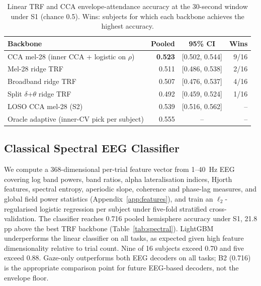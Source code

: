 \documentclass{article}
\begin{document}
\begin{table}[ht]
\centering
\small
\caption{Linear TRF and CCA envelope-attendance accuracy at the 30-second
window under S1 (chance 0.5). Wins: subjects for which each backbone achieves
the highest accuracy.}
\label{tab:trf}
\begin{tabular}{lrcr}
\toprule
Backbone & Pooled & 95\% CI & Wins \\
\midrule
CCA mel-28 (inner CCA + logistic on $\rho$) & \textbf{0.523} & [0.502, 0.544] & 9/16 \\
Mel-28 ridge TRF                            & 0.511           & [0.486, 0.538] & 2/16 \\
Broadband ridge TRF                         & 0.507           & [0.476, 0.537] & 4/16 \\
Split $\delta$+$\theta$ ridge TRF           & 0.492           & [0.459, 0.524] & 1/16 \\
LOSO CCA mel-28 (S2)                        & 0.539           & [0.516, 0.562] & --   \\
Oracle adaptive (inner-CV pick per subject) & 0.555           & --             & --   \\
\bottomrule
\end{tabular}
\end{table}

\subsection{Classical Spectral EEG Classifier}
\label{sec:spectral}

We compute a 368-dimensional per-trial feature vector from 1--40~Hz EEG
covering log band powers, band ratios, alpha lateralisation indices, Hjorth
features, spectral entropy, aperiodic slope, coherence and phase-lag measures,
and global field power statistics (Appendix~\ref{app:features}), and train an
$\ell_2$-regularised logistic regression per subject under five-fold
stratified cross-validation. The classifier reaches 0.716 pooled hemisphere
accuracy under S1, 21.8 pp above the best TRF backbone (Table~\ref{tab:spectral}).
LightGBM underperforms the linear classifier on all tasks, as expected given
high feature dimensionality relative to trial count. Nine of 16 subjects
exceed 0.70 and five exceed 0.88. Gaze-only outperforms both EEG decoders on
all tasks; B2 (0.716) is the appropriate comparison point for future
EEG-based decoders, not the envelope floor.
\end{document}

